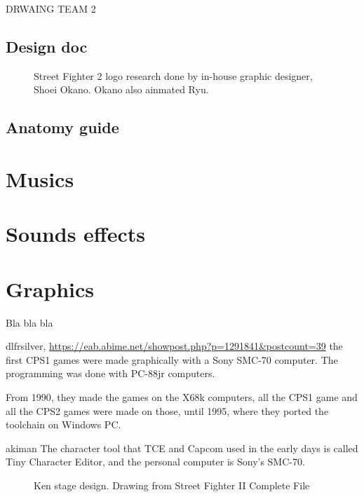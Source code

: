 DRWAING TEAM 2



\subsection{Design doc}

\begin{figure}[H]
\caption*{Street Fighter 2 logo research done by in-house graphic designer, Shoei Okano. Okano also ainmated Ryu.}
\end{figure}











\subsection{Anatomy guide}
\section{Musics}
\section{Sounds effects}




\section{Graphics}
Bla bla bla

\begin{q}{dlfrsilver, \url{https://eab.abime.net/showpost.php?p=1291841&postcount=39}}
the first CPS1 games were made graphically with a Sony SMC-70 computer.
The programming was done with PC-88jr computers.

From 1990, they made the games on the X68k computers, all the CPS1 game and all the CPS2 games were made on those, until 1995, where they ported the toolchain on Windows PC.
\end{q}


\begin{q}{akiman\cite{akiman}}
The character tool that TCE and Capcom used in the early days is called Tiny Character Editor, and the personal computer is Sony's SMC-70.
\end{q}

\begin{figure}[H]
\caption*{Ken stage design. Drawing from Street Fighter II Complete File}
\end{figure}

